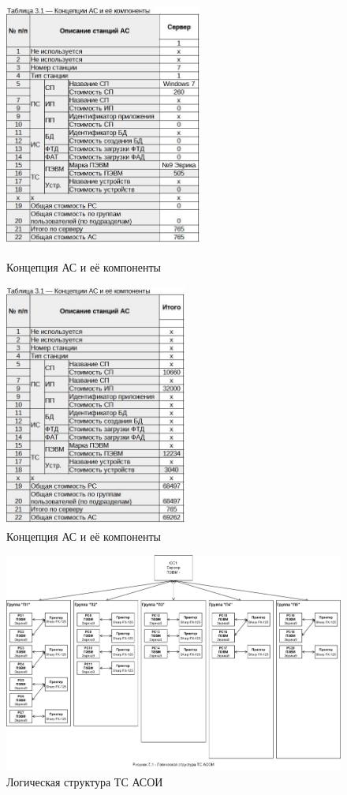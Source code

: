 \documentclass[12pt, a4paper, simple]{eskdtext}
\begin{document}
    \begin{figure}[!hp]
        \begin{minipage}{0.48\textwidth}
            \centering
            \includegraphics[height=8cm]
            {_docs/Таблица3-1КонцепцияАСИЕеКомпоненты__лаб2_С1.jpg}
            \caption{Концепция АС и её компоненты}
        \end{minipage}
        \begin{minipage}{0.48\textwidth}
            \centering
            \includegraphics[height=8cm]
            {_docs/Таблица3-1КонцепцияАСИЕеКомпоненты__лаб2.jpg}
            \caption{Концепция АС и её компоненты}
        \end{minipage}
     \end{figure}

    \begin{figure}[h!]
        \centering
        \includegraphics[width=16cm]
            {_docs/Рисунок7-1ЛогическаяСтруктураТСАСОИ__лаб2.png}
        \caption{Логическая структура ТС АСОИ}
    \end{figure}
\end{document}

